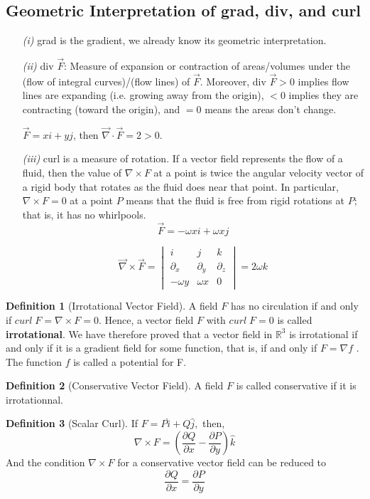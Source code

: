 \documentclass[12pt]{book}
\theoremstyle{definition}
\newtheorem{definition}{Definition}[section]
\theoremstyle{remark}
\begin{document}
  \subsection{Geometric Interpretation of grad, div, and curl}%
    \label{sub:Geometric Interpretation of grad, div, and curl}
   \begin{enumerate}
     \item[\it (i)] grad is the gradient, we already know its geometric interpretation. 
     \item[\it (ii)] div $\vec{{F}} {}$: Measure of expansion or contraction of areas/volumes under the (flow of integral curves)/(flow lines) of $\vec{{F}}$. Moreover, div $\vec{F} > 0$ implies flow lines are expanding (i.e. growing away from the origin), $<0$ implies they are contracting (toward the origin), and $=0 $ means the areas don't change. 
     \begin{example}$\vec{{F}} = x i + yj$, then $\vec{{\nabla}} \cdot \vec{{F}} = 2 >0.$
  \end{example}
      \item[\it (iii)] curl is a measure of rotation. If a vector field represents the flow of a fluid, then the value of $\nabla \times F$ at a point is twice the angular velocity vector of a rigid body that rotates as the fluid does near that point. In particular, $\nabla \times F = 0$ at a point $P$ means that the fluid is free from rigid rotations at $P$; that is, it has no whirlpools. 
       $$\vec{{F}} = - \omega x i+ \omega x j $$

       $$\vec{{\nabla}} \times \vec{{F}} = \begin{vmatrix}
         i & j & k \\ \partial_x & \partial_y & \partial_z \\ -\omega y & \omega x & 0
       \end{vmatrix} = 2 \omega k  $$
   
   \end{enumerate} 
   \begin{definition}[Irrotational Vector Field]
  A field $F$ has no circulation if and only if $curl\; F = \nabla \times F = 0$. Hence, a vector field $F$ with $curl \; F = 0$ is called \textbf{irrotational}. We have therefore proved that a vector field in $\mathbb{R}^3$ is irrotational if and only if it is a gradient field for some function, that is, if and only if $F = \nabla f$  . The function $f$ is called a potential for F.
  
\end{definition}
\begin{definition}[Conservative Vector Field] A field $F$ is called conservative if it is irrotationnal. 
\end{definition}
\begin{definition}[Scalar Curl]
  If $F = P\hat i + Q \hat j,$ then,
  $$\nabla \times F = \left( \frac{\partial {Q}}{\partial {x}} - \frac{\partial {P}}{\partial {y}} \right)\hat k $$
  And the condition $\nabla \times F$ for a conservative vector field can be reduced to 
  $$\frac{\partial {Q}}{\partial {x}} = \frac{\partial {P}}{\partial {y}}  $$
  
\end{definition}
\end{document}
